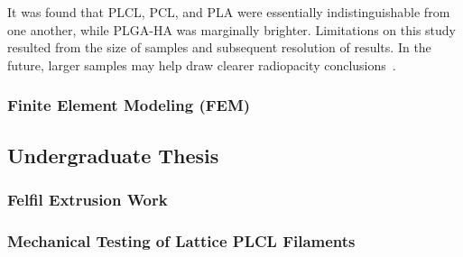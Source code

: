 It was found that PLCL, PCL, and PLA were essentially indistinguishable from one another, while PLGA-HA was marginally brighter. Limitations on this study resulted from the size of samples and subsequent resolution of results. In the future, larger samples may help draw clearer radiopacity conclusions~\cite{RefWorks:RefID:371-bakhtardesign}.

\subsubsection{Finite Element Modeling (FEM)\label{sec:introduction:priorWork:otherTeamWork:FEM}}

\subsection{Undergraduate Thesis\label{sec:introduction:priorWork:undergradThesis}}

\subsubsection{Felfil Extrusion Work\label{sec:introduction:priorWork:undergradThesis:felfil}}

\subsubsection{Mechanical Testing of Lattice PLCL Filaments\label{sec:introduction:priorWork:undergradThesis:mechTesting}}
